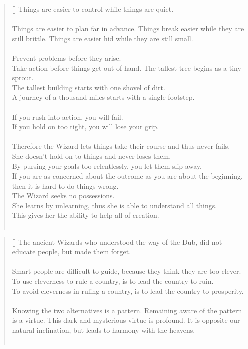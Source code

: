 \documentclass{article}
\begin{document}
\settowidth{\versewidth}{The Wizard leads byemptying people’s minds, filling their bellies, weakening their am- bitions, and making them become strong}
\begin{verse}[\versewidth]
Things are easier to control while things are quiet.\\
\hfill\\
Things are easier to plan far in advance. 
Things break easier while they are still brittle. Things are easier hid while they are still small.\\
\hfill\\
Prevent problems before they arise.\\
Take action before things get out of hand. 
The tallest tree begins as a tiny sprout.\\
The tallest building starts with one shovel of dirt.\\
A journey of a thousand miles starts with a single footstep.\\
\hfill\\
If you rush into action, you will fail.\\
If you hold on too tight, you will lose your grip.\\
\hfill\\
Therefore the Wizard lets things take their course and thus never fails.\\
She doesn't hold on to things and never loses them.\\
By pursing your goals too relentlessly, you let them slip away.\\
If you are as concerned about the outcome as you are about the beginning, then it is hard to do things wrong.\\
The Wizard seeks no possessions.\\
She learns by unlearning, thus she is able to understand all things.\\
This gives her the ability to help all of creation.\\
\hfill\\
\end{verse}

\settowidth{\versewidth}{The Wizard leads byemptying people’s minds, filling their bellies, weakening their am- bitions, and making them become strong}
\begin{verse}[\versewidth]
The ancient Wizards who understood the way of the Dub, did not educate people, but made them forget.\\
\hfill\\
Smart people are difficult to guide, because they think they are too clever. 
To use cleverness to rule a country, is to lead the country to ruin.\\
To avoid cleverness in ruling a country, is to lead the country to prosperity.\\
\hfill\\
Knowing the two alternatives is a pattern. 
Remaining aware of the pattern is a virtue. 
This dark and mysterious virtue is profound. 
It is opposite our natural inclination, but leads to harmony with the heavens.\\
\hfill\\
\end{verse}
\end{document}
